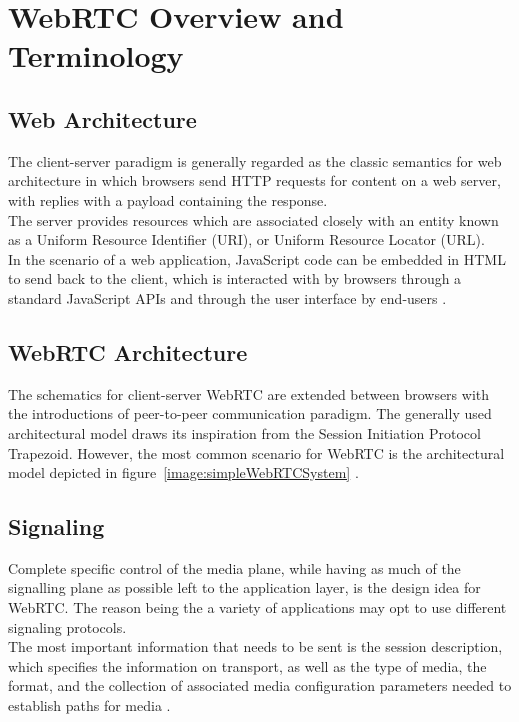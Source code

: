 \section{WebRTC Overview and Terminology}
\subsection{Web Architecture}
The client-server paradigm is generally regarded as the classic semantics for web architecture in which browsers send HTTP requests for content on a web server, with replies with a payload containing the response.
\\The server provides resources which are associated closely with an entity known as a Uniform Resource Identifier (URI), or Uniform Resource Locator (URL).
\\ In the scenario of a web application, JavaScript code can be embedded in HTML to send back to the client, which is interacted with by browsers through a standard JavaScript APIs and through the user interface by end-users \cite{loreto2014real}.

\subsection{WebRTC Architecture}
The schematics for client-server WebRTC are extended between browsers with the introductions of peer-to-peer communication paradigm. The generally used architectural model draws its inspiration from the Session Initiation Protocol Trapezoid. However, the most common scenario for WebRTC is the architectural model depicted in figure~\ref{image:simpleWebRTCSystem} \cite{loreto2014real}.

\subsection{Signaling}
Complete specific control of the media plane, while having as much of the signalling plane as possible left to the application layer, is the design idea for WebRTC. The reason being the a variety of applications may opt to use different signaling protocols.
\\ The most important information that needs to be sent is the session description, which specifies the information on transport, as well as the type of media, the format, and the collection of associated media configuration parameters needed to establish paths for media \cite{loreto2014real}.

